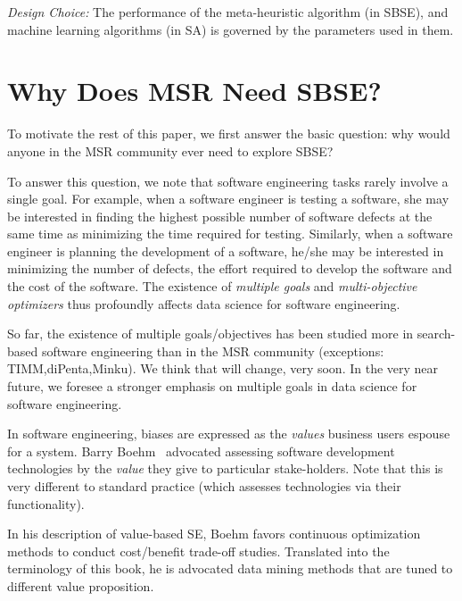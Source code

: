 \documentclass[table, xcdraw, sigconf,review, anonymous]{acmart}
\begin{document}
\noindent\textit{Design Choice:} The performance of the meta-heuristic algorithm (in SBSE), and machine learning algorithms (in SA) is governed by the parameters used in them. 

\section{Why Does MSR Need SBSE?}

To motivate the rest of this paper, we first answer the basic question: why would anyone in the MSR
community ever need to explore SBSE?

 To answer this question, we note that
 software engineering tasks rarely involve a
single goal. For example, when a software engineer
is testing a software, she may be interested in
finding the highest possible number of software
defects at the same time as minimizing the time
required for testing. Similarly, when a software
engineer is planning the development of a software,
he/she may be interested in minimizing the number of
defects, the effort required to develop the software
and the cost of the software. The existence of {\em
multiple goals} and {\em multi-objective optimizers}
thus profoundly affects data science for software
engineering.

So far, the existence of multiple goals/objectives
has been studied more in search-based software
engineering than in the MSR community (exceptions: TIMM,diPenta,Minku). We think that will change, very
soon. In the very near future, we foresee a stronger
emphasis on multiple goals in data science for
software engineering.

In software engineering, biases are expressed as the {\em values}
business users espouse for a system.
 Barry Boehm~\cite{boehm04}
advocated assessing
software development technologies
 by the {\em value} they give
to particular stake-holders. Note that this is
very different to standard practice (which assesses technologies
via their functionality).

In his description of value-based SE, Boehm favors
continuous optimization methods to  conduct cost/benefit
trade-off studies. Translated into the terminology
of this book, he is advocated data mining methods that are
tuned to different value proposition.
\end{document}

